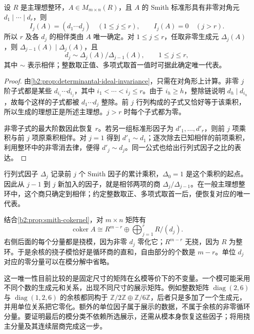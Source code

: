 \begin{theorem}\label{b2:thm:smith-uniqueness}
	设 \(R\) 是主理想整环，\(A\in M_{m\times n}(R)\)，且 \(A\) 的 Smith 标准形具有非零对角元 \(d_1\mid\cdots\mid d_r\)，则
	\[
		I_j(A)=(d_1\cdots d_j)\quad(1\le j\le r),\qquad I_j(A)=0\quad(j>r).
	\]
	所以 \(r\) 及各 \(d_j\) 的相伴类由 \(A\) 唯一确定。对 \(1\le j\le r\)，任取非零生成元 \(\Delta_j(A)\)，则 \(\Delta_{j-1}(A)\mid\Delta_j(A)\)，且
	\[
		d_j\sim\Delta_j(A)/\Delta_{j-1}(A),\qquad 1\le j\le r,
	\]
	其中 \(\sim\) 表示相伴；整数取正值、多项式取首一值时可据此确定唯一代表。
\end{theorem}
\begin{proof}
	由\cref{b2:prop:determinantal-ideal-invariance}，只需在对角形上计算。非零 \(j\) 阶子式都是某些 \(d_{i_1}\cdots d_{i_j}\)，其中 \(i_1<\cdots<i_j\le r\)。由于 \(i_h\ge h\)，整除链说明 \(d_h\mid d_{i_h}\)，故每个这样的子式都被 \(d_1\cdots d_j\) 整除。前 \(j\) 行列构成的子式又恰好等于该乘积，所以生成的理想正是所述主理想。\(j>r\) 时每个子式都为零。

	非零子式的最大阶数因此恢复 \(r\)。若另一组标准形因子为 \(d'_1,\ldots,d'_r\)，则前 \(j\) 项乘积与前 \(j\) 项原乘积相伴。对 \(j=1\) 得到 \(d'_1\sim d_1\)；逐次除去已知相伴的前项乘积，利用整环中的非零消去律，便得 \(d'_j\sim d_j\)。同一公式也给出行列式因子之比的表达。
\end{proof}

行列式因子 \(\Delta_j\) 记录前 \(j\) 个 Smith 因子的累计乘积，\(\Delta_0=1\) 是这个乘积的起点。因此从 \(j-1\) 到 \(j\) 新加入的因子，就是相邻两项的商 \(\Delta_j/\Delta_{j-1}\)。在一般主理想整环中，这个商只确定到相伴；约定整数取正、多项式取首一后，便恢复对应的唯一代表。

\ProseParagraphBreak
结合\cref{b2:prop:smith-cokernel}，对 \(m\times n\) 矩阵有
\[
	\operatorname{coker}A\cong R^{m-r}\oplus\bigoplus_{j=1}^rR/(d_j).
\]
右侧后面的每个分量都是挠模，因为非零 \(d_j\) 零化它；\(R^{m-r}\) 无挠，因为 \(R\) 为整环。于是余核的挠子模恰好是循环商的直和，自由部分的个数是 \(m-r\)。单位 \(d_j\) 对应的零分量可以在模分解中省略。

\ProseParagraphBreak
这一唯一性目前比较的是固定尺寸的矩阵在幺模等价下的不变量。一个模可能采用不同个数的生成元和关系，出现不同尺寸的展示矩阵。例如整数矩阵 \(\operatorname{diag}(2,6)\) 与 \(\operatorname{diag}(1,2,6)\) 的余核都同构于 \(\mathbb Z/2\mathbb Z\oplus\mathbb Z/6\mathbb Z\)，后者只是多加了一个生成元，并用单位关系把它零化。额外的单位因子属于展示的数据，不属于余核的非零循环分量。要证明最后的模分类不依赖所选展示，还需从模本身恢复这些因子；将用挠主分量及其连续层商完成这一步。

